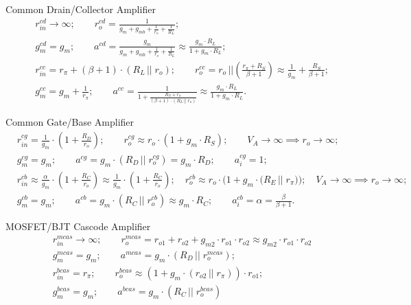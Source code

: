 \documentclass[11pt]{article}
\begin{document}
\begin{sectionbox}{Common Drain/Collector Amplifier}
\begin{align*}
& r_{in}^{cd} \rightarrow \infty; \qquad
  r_o^{cd} = \frac{1}{g_m + g_{mb} + \frac{1}{r_o} + \frac{1}{R_L}};  \\[0.5em]
& g_m^{cd} = g_m; \qquad
  a^{cd} = \frac{g_m}{g_m + g_{mb} + \frac{1}{r_o} + \frac{1}{R_L}} \approx 
  \frac{g_m \cdot R_L}{1 + g_m \cdot R_L}; \\[2em]
& r_{in}^{cc} = r_{\pi} + (\beta + 1) \cdot (R_L \, || \; r_o); \qquad
  r_o^{cc} = r_o \, \Big|\Big| \left( \frac{r_{\pi} + R_S}{\beta + 1} \right) \approx 
  \frac{1}{g_m} + \frac{R_S}{\beta + 1}; \\[0.5em]
& g_m^{cc} = g_m + \frac{1}{r_{\pi}}; \qquad
  a^{cc} = \frac{1}{1 + \frac{R_S + r_{\pi}}{(\beta + 1) \cdot (R_L \, || \; r_o)}} \approx 
  \frac{g_m \cdot R_L}{1 + g_m \cdot R_L}.
\end{align*}
\end{sectionbox}

\begin{sectionbox}{Common Gate/Base Amplifier}
\begin{align*}
& r_{in}^{cg} = \frac{1}{g_m} \cdot \left( 1 + \frac{R_D}{r_o} \right); \qquad 
  r_o^{cg} \approx r_o \cdot (1 + g_m \cdot R_S); \qquad 
  V_A \rightarrow \infty \implies r_o \rightarrow \infty; \\[0.5em]
& g_m^{cg} = g_m; \qquad
  a^{cg} = g_m \cdot \left( R_D \, \Big|\Big| \; r_o^{cg} \right) = 
    g_m \cdot R_D; \qquad
  a_i^{cg} = 1; \\[2em]
& r_{in}^{cb} \approx \frac{\alpha}{g_m} \cdot \left( 1 + \frac{R_C}{r_o} \right) \approx 
    \frac{1}{g_m} \cdot \left( 1 + \frac{R_C}{r_o} \right); \quad 
  r_o^{cb} \approx r_o \cdot \Big(1 + g_m \cdot \big( R_E \, \big|\big| \; r_{\pi} \big) \Big); \quad
  V_A \rightarrow \infty \implies r_o \rightarrow \infty; \\[0.5em]
& g_m^{cb} = g_m; \qquad
  a^{cb} = g_m \cdot \left( R_C \, \big|\big| \; r_o^{cb} \right) \approx g_m \cdot R_C; \qquad
  a_i^{cb} = \alpha = \frac{\beta}{\beta + 1}.
\end{align*}
\end{sectionbox}

\begin{sectionbox}{MOSFET/BJT Cascode Amplifier}
\begin{align*}
& r_{in}^{mcas} \rightarrow \infty; \qquad
  r_o^{mcas} = r_{o1} + r_{o2} + g_{m2} \cdot r_{o1} \cdot r_{o2} \approx 
  g_{m2} \cdot r_{o1} \cdot r_{o2} \\[0.5em]
& g_m^{mcas} = g_{m}; \qquad
  a^{mcas} = g_{m} \cdot \left( R_D \, \big|\big| \; r_o^{mcas} \right); \\[2em]
& r_{in}^{bcas} = r_{\pi}; \qquad
  r_o^{bcas} \approx \left( 1 + g_m \cdot \left( r_{o2} \, \big|\big| \; r_{\pi} \right) \right) \cdot r_{o1}; \\[0.5em]
& g_m^{bcas} = g_{m}; \qquad
  a^{bcas} = g_{m} \cdot \left( R_C \, \big|\big| \; r_o^{bcas} \right)
\end{align*}
\end{sectionbox}
\end{document}
